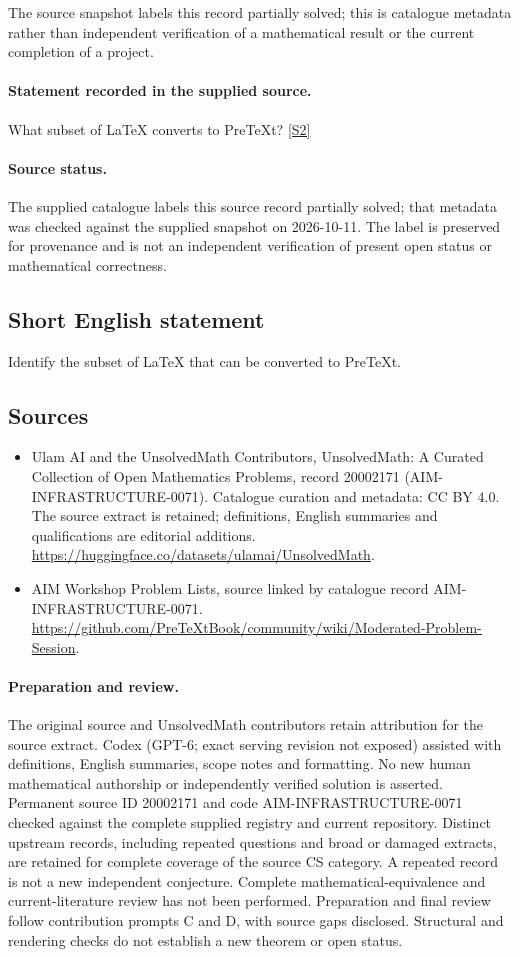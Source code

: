 \documentclass[11pt]{article}
\begin{document}
The source snapshot labels this record partially solved; this is catalogue metadata rather than independent verification of a mathematical result or the current completion of a project.
\paragraph{Statement recorded in the supplied source.}
What subset of LaTeX converts to PreTeXt? \href{https://github.com/PreTeXtBook/community/wiki/Moderated-Problem-Session}{[S2]}
\paragraph{Source status.}
The supplied catalogue labels this source record partially solved; that metadata was checked against the supplied snapshot on 2026-10-11. The label is preserved for provenance and is not an independent verification of present open status or mathematical correctness.
\subsection{Short English statement}
Identify the subset of LaTeX that can be converted to PreTeXt.
\subsection{Sources}
\begin{itemize}
\item[S1] Ulam AI and the UnsolvedMath Contributors, UnsolvedMath: A Curated Collection of Open Mathematics Problems, record 20002171 (AIM-INFRASTRUCTURE-0071). Catalogue curation and metadata: CC BY 4.0. The source extract is retained; definitions, English summaries and qualifications are editorial additions.
\url{https://huggingface.co/datasets/ulamai/UnsolvedMath}.
\item[S2] AIM Workshop Problem Lists, source linked by catalogue record AIM-INFRASTRUCTURE-0071.
\url{https://github.com/PreTeXtBook/community/wiki/Moderated-Problem-Session}.
\end{itemize}
\paragraph{Preparation and review.}
The original source and UnsolvedMath contributors retain attribution for the source extract. Codex (GPT-6; exact serving revision not exposed) assisted with definitions, English summaries, scope notes and formatting. No new human mathematical authorship or independently verified solution is asserted. Permanent source ID 20002171 and code AIM-INFRASTRUCTURE-0071 checked against the complete supplied registry and current repository. Distinct upstream records, including repeated questions and broad or damaged extracts, are retained for complete coverage of the source CS category. A repeated record is not a new independent conjecture. Complete mathematical-equivalence and current-literature review has not been performed. Preparation and final review follow contribution prompts C and D, with source gaps disclosed. Structural and rendering checks do not establish a new theorem or open status.
\label{end:20002171}
\end{document}
